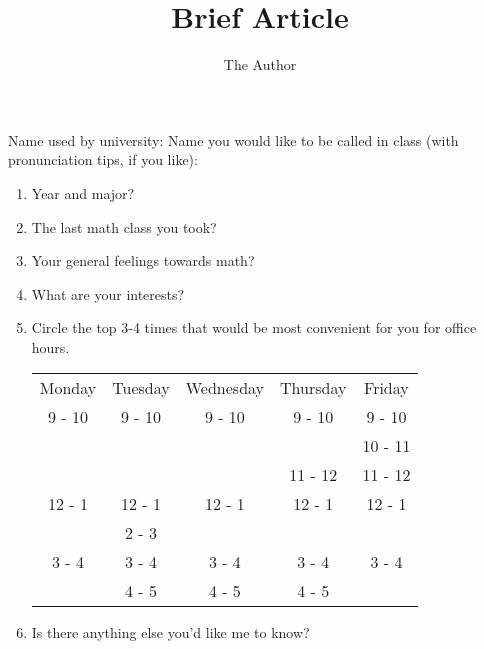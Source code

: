\documentclass[11pt]{article} %
\title{Brief Article}
\author{The Author}
\begin{document}
Name used by university: 
\vfill
Name you would like to be called in class (with pronunciation tips, if you like): 
\vfill
\begin{enumerate}

\item Year and major? 
\vfill
\item The last math class you took?
\vfill
\vfill
\item Your general feelings towards math?
\vfill
\vfill
\vfill
\item What are your interests?
\vfill
\vfill
\vfill
\item Circle the top 3-4 times that would be most convenient for you for office hours. 

\begin{tabular}{ c c c c c}
Monday & Tuesday & Wednesday & Thursday & Friday \\
9 - 10 & 9 - 10 & 9 - 10  & 9 - 10  &9 - 10  \\
 &  & &  &10 - 11 \\
          & &  &11 - 12  & 11 - 12 \\
12 - 1 & 12 - 1 & 12 - 1&12 - 1  & 12 - 1 \\
            & 2 - 3 & & &   \\
3 - 4  & 3 - 4 & 3 - 4 & 3 - 4 & 3 - 4 \\
 & 4 - 5 & 4 - 5 & 4 - 5 &  \\
\end{tabular}
\item Is there anything else you'd like me to know?
\vfill
\vfill
\vfill
\end{enumerate}
\end{document}
